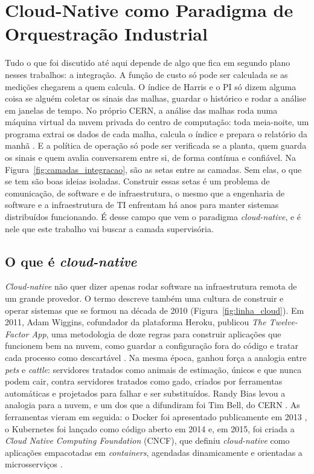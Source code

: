 
\section{Cloud-Native como Paradigma de Orquestração Industrial}
\label{sec:cloudnative}

Tudo o que foi discutido até aqui depende de algo que fica em segundo plano nesses trabalhos: a integração. A função de custo só pode ser calculada se as medições chegarem a quem calcula. O índice de Harris e o PI só dizem alguma coisa se alguém coletar os sinais das malhas, guardar o histórico e rodar a análise em janelas de tempo. No próprio CERN, a análise das malhas roda numa máquina virtual da nuvem privada do centro de computação: toda meia-noite, um programa extrai os dados de cada malha, calcula o índice e prepara o relatório da manhã \cite{Bradu2018}. E a política de operação só pode ser verificada se a planta, quem guarda os sinais e quem avalia conversarem entre si, de forma contínua e confiável. Na Figura~\ref{fig:camadas_integracao}, são as setas entre as camadas. Sem elas, o que se tem são boas ideias isoladas. Construir essas setas é um problema de comunicação, de software e de infraestrutura, o mesmo que a engenharia de software e a infraestrutura de TI enfrentam há anos para manter sistemas distribuídos funcionando. É desse campo que vem o paradigma \textit{cloud-native}, e é nele que este trabalho vai buscar a camada supervisória.

\subsection{O que é \textit{cloud-native}}
\label{subsec:oque_cloud}

\textit{Cloud-native} não quer dizer apenas rodar software na infraestrutura remota de um grande provedor. O termo descreve também uma cultura de construir e operar sistemas que se formou na década de 2010 (Figura~\ref{fig:linha_cloud}). Em 2011, Adam Wiggins, cofundador da plataforma Heroku, publicou \textit{The Twelve-Factor App}, uma metodologia de doze regras para construir aplicações que funcionem bem na nuvem, como guardar a configuração fora do código e tratar cada processo como descartável \cite{Wiggins2011}. Na mesma época, ganhou força a analogia entre \textit{pets} e \textit{cattle}: servidores tratados como animais de estimação, únicos e que nunca podem cair, contra servidores tratados como gado, criados por ferramentas automáticas e projetados para falhar e ser substituídos. Randy Bias levou a analogia para a nuvem, e um dos que a difundiram foi Tim Bell, do CERN \cite{Bias2016}. As ferramentas vieram em seguida: o Docker foi apresentado publicamente em 2013 \cite{Johnston2022}, o Kubernetes foi lançado como código aberto em 2014 \cite{Shuiguang2023} e, em 2015, foi criada a \textit{Cloud Native Computing Foundation} (CNCF), que definiu \textit{cloud-native} como aplicações empacotadas em \textit{containers}, agendadas dinamicamente e orientadas a microsserviços \cite{CNCF2015}.

